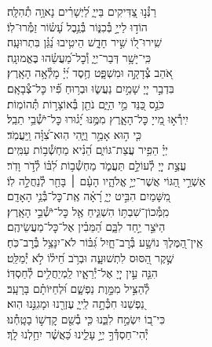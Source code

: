 \documentclass[twoside, openany, parskip=half, 11pt]{book}
\begin{document}
\begin{narrow}
רַנְּ֯נ֣וּ צַ֭דִּיקִים בַּייָ֑ \hfill
לַ֝יְשָׁרִ֗ים נָאוָ֥ה תְ֯הִלָּֽה׃ \\
הוֹד֣וּ לַייָ֣ בְּ֯כִנּ֑וֹר \hfill בְּ֯נֵ֥בֶל עָ֝שׂ֗וֹר זַמְּ֯רוּ־לֽוֹ׃ \\
שִֽׁירוּ־ל֭וֹ שִׁ֣יר חָדָ֑שׁ \hfill הֵיטִ֥יבוּ נַ֝גֵּ֗ן בִּתְרוּעָֽה׃ \\
כִּֽי־יָשָׁ֥ר דְּבַר־יְיָ֑ \hfill וְ֯כׇל־מַ֝עֲשֵׂ֗הוּ בֶּאֱמוּנָֽה׃ \\
אֹ֭הֵב צְ֯דָקָ֣ה וּמִשְׁפָּ֑ט \hfill חֶ֥סֶד יְ֝יָ֗ מָלְ֯אָ֥ה הָאָֽרֶץ׃ \\
בִּדְבַ֣ר יְיָ֭ שָׁמַ֣יִם נַעֲשׂ֑וּ \hfill וּבְר֥וּחַ פִּ֗֝יו כׇּל־צְ֯בָאָֽם׃ \\
כֹּנֵ֣ס כַּ֭נֵּד מֵ֣י הַיָּ֑ם \hfill נֹתֵ֖ן בְּ֯אוֹצָר֣וֹת תְּ֯הוֹמֽוֹת׃ \\
יִֽירְ֯א֣וּ מֵ֭ייָ כׇּל־הָאָ֑רֶץ \hfill מִמֶּ֥נּוּ יָ֝ג֗וּרוּ כׇּל־יֹשְׁ֯בֵ֥י תֵבֵֽל׃ \\
כִּ֤י ה֣וּא אָמַ֣ר וַיֶּ֑הִי \hfill הֽוּא־צִ֝וָּ֗ה וַֽיַּעֲמֹֽד׃ \\
יְיָ֗ הֵפִ֥יר עֲצַת־גּוֹיִ֑ם \hfill הֵ֝נִ֗יא מַחְשְׁ֯ב֥וֹת עַמִּֽים׃ \\
עֲצַ֣ת יְיָ֭ לְ֯עוֹלָ֣ם תַּעֲמֹ֑ד \hfill מַחְשְׁ֯ב֥וֹת לִ֝בּ֗וֹ לְ֯דֹ֣ר וָדֹֽר׃ \\
אַשְׁרֵ֣י הַ֭גּוֹי אֲשֶׁר־יְיָ֣ אֱלֹהָ֑יו \hfill הָעָ֓ם ׀ בָּחַ֖ר לְ֯נַחֲלָ֣ה לֽוֹ׃ \\
מִ֭שָּׁמַיִם הִבִּ֣יט יְיָ֑ \hfill רָ֝אָ֗ה אֶֽת־כׇּל־בְּ֯נֵ֥י הָאָדָֽם׃ \\
מִֽמְּ֯כוֹן־שִׁבְתּ֥וֹ הִשְׁגִּ֑יחַ \hfill אֶ֖ל כׇּל־יֹשְׁ֯בֵ֣י הָאָֽרֶץ׃ \\
הַיֹּצֵ֣ר יַ֣חַד לִבָּ֑ם \hfill הַ֝מֵּבִ֗ין אֶל־כׇּל־מַעֲשֵׂיהֶֽם׃ \\
אֵֽין־הַ֭מֶּלֶךְ נוֹשָׁ֣ע בְּ֯רׇב־חָ֑יִל \hfill גִּ֝בּ֗וֹר לֹא־יִנָּצֵ֥ל בְּ֯רׇב־כֹּֽחַ׃ \\
שֶׁ֣קֶר הַ֭סּוּס לִתְשׁוּעָ֑ה \hfill וּבְרֹ֥ב חֵ֝יל֗וֹ לֹ֣א יְ֯מַלֵּֽט׃ \\
הִנֵּ֤ה עֵ֣ין יְיָ֭ אֶל־יְ֯רֵאָ֑יו \hfill לַֽמְיַחֲלִ֥ים לְ֯חַסְדּֽוֹ׃ \\
לְ֯הַצִּ֣יל מִמָּ֣וֶת נַפְשָׁ֑ם \hfill וּ֝לְחַיּוֹתָ֗ם בָּרָעָֽב׃ \\
נַ֭פְשֵׁנוּ חִכְּ֯תָ֣ה לַֽייָ֑ \hfill עֶזְרֵ֖נוּ וּמָגִנֵּ֣נוּ הֽוּא׃ \\
כִּי־ב֭וֹ יִשְׂמַ֣ח לִבֵּ֑נוּ \hfill כִּ֤י בְ֯שֵׁ֖ם קׇדְשׁ֣וֹ בָטָֽחְ֯נוּ׃ \\
יְ֯הִי־חַסְדְּ֯ךָ֣ יְיָ֣ עָלֵ֑ינוּ \hfill כַּ֝אֲשֶׁ֗ר יִחַ֥לְנוּ לָֽךְ׃ \\



\end{narrow}
\end{document}

